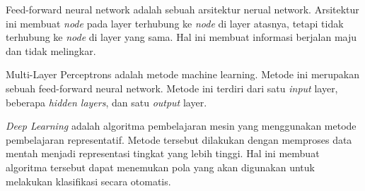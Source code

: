 \documentclass[12pt, a4paper, twoside]{article}
\begin{document}
Feed-forward neural network adalah sebuah arsitektur nerual network. Arsitektur ini membuat \textit{node} pada layer terhubung ke \textit{node} di layer atasnya, tetapi tidak terhubung ke \textit{node} di layer yang sama. Hal ini membuat informasi berjalan maju dan tidak melingkar. \cite{Schmidt.1992}

Multi-Layer Perceptrons adalah metode machine learning. Metode ini merupakan sebuah feed-forward neural network. Metode ini terdiri dari satu \textit{input} layer, beberapa \textit{hidden layers}, dan satu \textit{output} layer. \cite{Riedmiller.1994}

\textit{Deep Learning} adalah algoritma pembelajaran mesin yang menggunakan metode pembelajaran representatif. Metode tersebut dilakukan dengan memproses data mentah menjadi representasi tingkat yang lebih tinggi. Hal ini membuat algoritma tersebut dapat menemukan pola yang akan digunakan untuk melakukan klasifikasi secara otomatis. \cite{LeCun.2015}

\printbibliography[title = Daftar Pustaka]
\end{document}
